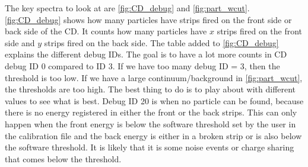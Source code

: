 \documentclass[twoside,english]{uiofysmaster/uiofysmaster}
\newcommand{\Sm}{$^{140}$Sm} %
\newcommand{\Pb}{$^{208}$Pb}
\let\orgautoref\autoref
\renewcommand{\autoref}
        {%
		 \def\sectionautorefname{Section}%
		 \def\subsectionautorefname{Section}%
		 \def\subsubsectionautorefname{Section}%
		 \def\chapterautorefname{Chapter}%
          \orgautoref}
\begin{document}
The key spectra to look at are \autoref{fig:CD_debug} and \autoref{fig:part_wcut}. 
\autoref{fig:CD_debug} shows how many particles have strips fired on the front side or back side of the CD. 
It counts how many particles have $x$ strips fired on the front side and $y$ strips fired on the back side. 
The table added to \autoref{fig:CD_debug} explains the different debug IDs. 
The goal is to have a lot more counts in CD debug ID 0 compared to ID 3.
If we have too many debug ID = 3, then the threshold is too low. 
If we have a large continuum/background in \autoref{fig:part_wcut}, the thresholds are too high. 
The best thing to do is to play about with different values to see what is best.
Debug ID 20 is when no particle can be found, because there is no energy registered in either the front or the back strips. 
This can only happen when the front energy is below the software threshold set by the user in the calibration file and the back energy is either in a broken strip or is also below the software threshold. 
It is likely that it is some noise events or charge sharing that comes below the threshold. 

\end{document}
